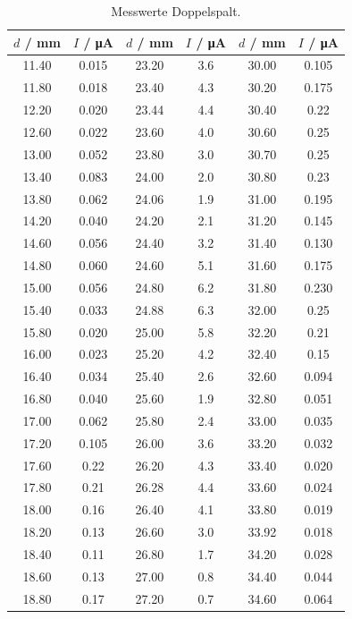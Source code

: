 \begin{table}
  \centering
  \caption{Messwerte Doppelspalt.}
  \label{tab:3}
  \begin{tabular}{c c || c c || c c}
    \toprule
    $d$ / \si{\milli\meter} & $I$ / \si{\micro\ampere} & $d$ / \si{\milli\meter} & $I$ / \si{\micro\ampere} & $d$ / \si{\milli\meter} & $I$ / \si{\micro\ampere} \\
    \midrule
    11.40 & 0.015 & 23.20 & 3.6 & 30.00 & 0.105 \\
    11.80 & 0.018 & 23.40 & 4.3 & 30.20 & 0.175 \\
    12.20 & 0.020 & 23.44 & 4.4 & 30.40 & 0.22 \\
    12.60 & 0.022 & 23.60 & 4.0 & 30.60 & 0.25 \\
    13.00 & 0.052 & 23.80 & 3.0 & 30.70 & 0.25 \\
    13.40 & 0.083 & 24.00 & 2.0 & 30.80 & 0.23 \\
    13.80 & 0.062 & 24.06 & 1.9 & 31.00 & 0.195 \\
    14.20 & 0.040 & 24.20 & 2.1 & 31.20 & 0.145 \\
    14.60 & 0.056 & 24.40 & 3.2 & 31.40 & 0.130 \\
    14.80 & 0.060 & 24.60 & 5.1 & 31.60 & 0.175 \\
    15.00 & 0.056 & 24.80 & 6.2 & 31.80 & 0.230 \\
    15.40 & 0.033 & 24.88 & 6.3 & 32.00 & 0.25 \\
    15.80 & 0.020 & 25.00 & 5.8 & 32.20 & 0.21 \\
    16.00 & 0.023 & 25.20 & 4.2 & 32.40 & 0.15 \\
    16.40 & 0.034 & 25.40 & 2.6 & 32.60 & 0.094 \\
    16.80 & 0.040 & 25.60 & 1.9 & 32.80 & 0.051 \\
    17.00 & 0.062 & 25.80 & 2.4 & 33.00 & 0.035 \\
    17.20 & 0.105 & 26.00 & 3.6 & 33.20 & 0.032 \\
    17.60 & 0.22 & 26.20 & 4.3 & 33.40 & 0.020 \\
    17.80 & 0.21 & 26.28 & 4.4 & 33.60 & 0.024 \\
    18.00 & 0.16 & 26.40 & 4.1 & 33.80 & 0.019 \\
    18.20 & 0.13 & 26.60 & 3.0 & 33.92 & 0.018 \\
    18.40 & 0.11 & 26.80 & 1.7 & 34.20 & 0.028 \\
    18.60 & 0.13 & 27.00 & 0.8 & 34.40 & 0.044 \\
    18.80 & 0.17 & 27.20 & 0.7 & 34.60 & 0.064 \\

\end{tabular}
\end{table}
